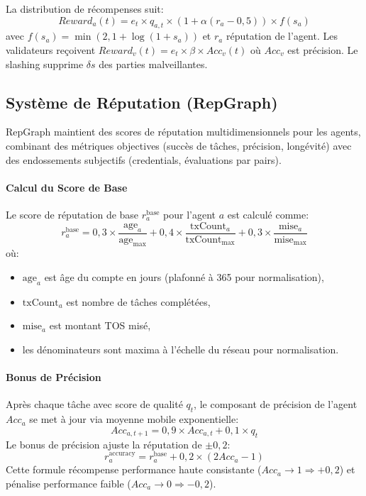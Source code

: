 \documentclass[11pt]{article}
\begin{document}
La distribution de récompenses suit:
\begin{equation}
Reward_a(t) = e_t \times q_{a,t} \times \left(1 + \alpha (r_a - 0,5)\right) \times f(s_a)
\end{equation}
avec $f(s_a) = \min(2, 1 + \log(1+s_a))$ et $r_a$ réputation de l'agent. Les validateurs reçoivent $Reward_v(t) = e_t \times \beta \times Acc_v(t)$ où $Acc_v$ est précision. Le slashing supprime $\delta s$ des parties malveillantes.

\subsection{Système de Réputation (RepGraph)}
\label{sec:reputation}
RepGraph maintient des scores de réputation multidimensionnels pour les agents, combinant des métriques objectives (succès de tâches, précision, longévité) avec des endossements subjectifs (credentials, évaluations par pairs).

\paragraph{Calcul du Score de Base} Le score de réputation de base $r_a^{\text{base}}$ pour l'agent $a$ est calculé comme:
\begin{equation}
r_a^{\text{base}} = 0,3 \times \frac{\text{age}_a}{\text{age}_{\max}} + 0,4 \times \frac{\text{txCount}_a}{\text{txCount}_{\max}} + 0,3 \times \frac{\text{mise}_a}{\text{mise}_{\max}}
\end{equation}
où:
\begin{itemize}[noitemsep]
  \item $\text{age}_a$ est âge du compte en jours (plafonné à 365 pour normalisation),
  \item $\text{txCount}_a$ est nombre de tâches complétées,
  \item $\text{mise}_a$ est montant TOS misé,
  \item les dénominateurs sont maxima à l'échelle du réseau pour normalisation.
\end{itemize}

\paragraph{Bonus de Précision} Après chaque tâche avec score de qualité $q_t$, le composant de précision de l'agent $Acc_a$ se met à jour via moyenne mobile exponentielle:
\begin{equation}
Acc_{a,t+1} = 0,9 \times Acc_{a,t} + 0,1 \times q_t
\end{equation}
Le bonus de précision ajuste la réputation de $\pm 0,2$:
\begin{equation}
r_a^{\text{accuracy}} = r_a^{\text{base}} + 0,2 \times (2 Acc_a - 1)
\end{equation}
Cette formule récompense performance haute consistante ($Acc_a \to 1 \Rightarrow +0,2$) et pénalise performance faible ($Acc_a \to 0 \Rightarrow -0,2$).
\end{document}
